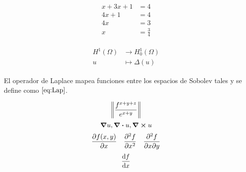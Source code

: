 \documentclass{book}
\begin{document}
\begin{align*}
    x+3x+1&=4\\
    4x +1 &= 4\\
    4x &= 3\\
    x &= \frac{3}{4}
\end{align*}

\begin{align}
\label{eq:Lap} \tag{$\rho$}
\begin{split}
    H^{1}(\Omega) &\to H_{0}^{1}(\Omega) \\
     u &\mapsto \Delta (u)
\end{split}
\end{align}

El operador de Laplace mapea funciones entre los espacios de Sobolev tales y se define como $\eqref{eq:Lap}$.

\[ \norm{\frac{f^{x+y+z}}{e^{x+y}}} \]
\[  \grad u, \div u, \curl u \]
\[ \pdv{f(x,y)}{x} \quad \pdv[2]{f}{x} \quad \pdv{f}{x}{y} \]
\[ \dv{f}{x} \]
\end{document}
